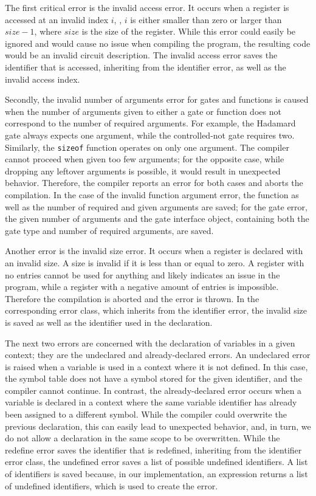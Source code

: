 The first critical error is the invalid access error. It occurs when a register is accessed at an invalid index $i$, \ie, $i$ is either smaller than zero or larger than $size - 1$, where $size$ is the size of the register. While this error could easily be ignored and would cause no issue when compiling the program, the resulting code would be an invalid circuit description. The invalid access error saves the identifier that is accessed, inheriting from the identifier error, as well as the invalid access index.

Secondly, the invalid number of arguments error for gates and functions is caused when the number of arguments given to either a gate or function does not correspond to the number of required arguments. For example, the Hadamard gate always expects one argument, while the controlled-not gate requires two. Similarly, the \texttt{sizeof} function operates on only one argument. The compiler cannot proceed when given too few arguments; for the opposite case, while dropping any leftover arguments is possible, it would result in unexpected behavior.
Therefore, the compiler reports an error for both cases and aborts the compilation. In the case of the invalid function argument error, the function as well as the number of required and given arguments are saved; for the gate error, the given number of arguments and the gate interface object, containing both the gate type and number of required arguments, are saved.

Another error is the invalid size error. It occurs when a register is declared with an invalid size. A size is invalid if it is less than or equal to zero. A register with no entries cannot be used for anything and likely indicates an issue in the program, while a register with a negative amount of entries is impossible. Therefore the compilation is aborted and the error is thrown. In the corresponding error class, which inherits from the identifier error, the invalid size is saved as well as the identifier used in the declaration.

The next two errors are concerned with the declaration of variables in a given context; they are the undeclared and already-declared errors. An undeclared error is raised when a variable is used in a context where it is not defined. In this case, the symbol table does not have a symbol stored for the given identifier, and the compiler cannot continue. In contrast, the already-declared error occurs when a variable is declared in a context where the same variable identifier has already been assigned to a different symbol. While the compiler could overwrite the previous declaration, this can easily lead to unexpected behavior, and, in turn, we do not allow a declaration in the same scope to be overwritten. While the redefine error saves the identifier that is redefined, inheriting from the identifier error class, the undefined error saves a list of possible undefined identifiers. A list of identifiers is saved because, in our implementation, an expression returns a list of undefined identifiers, which is used to create the error.

